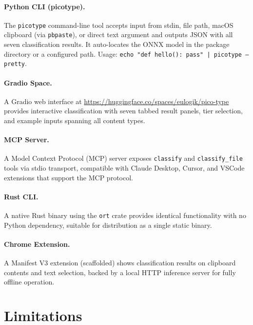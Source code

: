 \documentclass[11pt,a4paper]{article}
\begin{document}
\paragraph{Python CLI (picotype).}
The \texttt{picotype} command-line tool accepts input from stdin, file path, macOS clipboard (via \texttt{pbpaste}), or direct text argument and outputs JSON with all seven classification results.
It auto-locates the ONNX model in the package directory or a configured path.
Usage: \texttt{echo "def hello(): pass" | picotype --pretty}.

\paragraph{Gradio Space.}
A Gradio web interface at \url{https://huggingface.co/spaces/eulogik/pico-type} provides interactive classification with seven tabbed result panels, tier selection, and example inputs spanning all content types.

\paragraph{MCP Server.}
A Model Context Protocol (MCP) server exposes \texttt{classify} and \texttt{classify\_file} tools via stdio transport, compatible with Claude Desktop, Cursor, and VSCode extensions that support the MCP protocol.

\paragraph{Rust CLI.}
A native Rust binary using the \texttt{ort} crate provides identical functionality with no Python dependency, suitable for distribution as a single static binary.

\paragraph{Chrome Extension.}
A Manifest V3 extension (scaffolded) shows classification results on clipboard contents and text selection, backed by a local HTTP inference server for fully offline operation.

\section{Limitations}
\label{sec:limitations}
\end{document}
